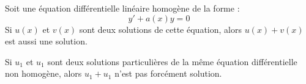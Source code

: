 \documentclass[a4paper,12pt]{article}
\begin{document}
\begin{tcolorbox}[colframe=black, colback=gray!5, title=NB.]
Soit une équation différentielle linéaire homogène de la forme :
\[
y' + a(x)y = 0
\]
Si \(u(x)\) et \(v(x)\) sont deux solutions de cette équation, alors \(u(x) + v(x)\) est aussi une solution.
\end{tcolorbox}
\begin{tcolorbox}[colframe=black, colback=gray!5, title=NB.]
Si $u_{1}$ et $u_{1}$ sont deux solutions particulières de la même équation différentielle non homogène, alors $u_{1}+u_{1}$ n’est pas forcément solution.
\end{tcolorbox}
\end{document}
